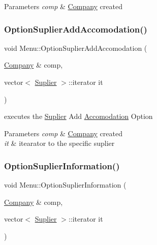 \begin{DoxyParams}{Parameters}
{\em comp} & \hyperlink{class_company}{Company} created \\
\hline
\end{DoxyParams}
\hypertarget{class_menu_a5a206bd2b3e8dfa47b2526454489a223}{}\label{class_menu_a5a206bd2b3e8dfa47b2526454489a223} 
\subsubsection{\texorpdfstring{Option\+Suplier\+Add\+Accomodation()}{OptionSuplierAddAccomodation()}}
{\footnotesize\ttfamily void Menu\+::\+Option\+Suplier\+Add\+Accomodation (\begin{DoxyParamCaption}\item[{\hyperlink{class_company}{Company} \&}]{comp,  }\item[{vector$<$ \hyperlink{class_suplier}{Suplier} $>$\+::iterator}]{it }\end{DoxyParamCaption})}



executes the \hyperlink{class_suplier}{Suplier} Add \hyperlink{class_accomodation}{Accomodation} Option 


\begin{DoxyParams}{Parameters}
{\em comp} & \hyperlink{class_company}{Company} created\\
\hline
{\em it} & itearator to the specific suplier \\
\hline
\end{DoxyParams}
\hypertarget{class_menu_a8b970a2863470d8d06918ad582522371}{}\label{class_menu_a8b970a2863470d8d06918ad582522371} 
\subsubsection{\texorpdfstring{Option\+Suplier\+Information()}{OptionSuplierInformation()}}
{\footnotesize\ttfamily void Menu\+::\+Option\+Suplier\+Information (\begin{DoxyParamCaption}\item[{\hyperlink{class_company}{Company} \&}]{comp,  }\item[{vector$<$ \hyperlink{class_suplier}{Suplier} $>$\+::iterator}]{it }\end{DoxyParamCaption})}



